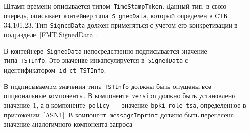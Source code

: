 Штамп времени описывается типом~\texttt{TimeStampToken}. 
Данный тип, в свою очередь, описывает контейнер типа~\texttt{SignedData},
который определен в СТБ 34.101.23.
%
Тип~\texttt{SignedData} должен применяться с учетом его 
конкретизации в подразделе~\ref{FMT.SignedData}.

В контейнере~\texttt{SignedData} непосредственно подписывается 
значение типа~\texttt{TSTInfo}. Это значение инкапсулируется 
в~\texttt{SignedData} с идентификатором~\texttt{id-ct-TSTInfo}.

В подписываемом значении типа~\texttt{TSTInfo} должны быть опущены
все опциональные компоненты. 
%
В компоненте~\texttt{version} должно быть установлено значение~$1$,
а в компоненте~\texttt{policy}~--- значение~\texttt{bpki-role-tsa},
определенное в приложении~\ref{ASN1}.
%
В компонент~\texttt{messageImprint} должно быть перенесено
значение аналогичного компонента запроса.

